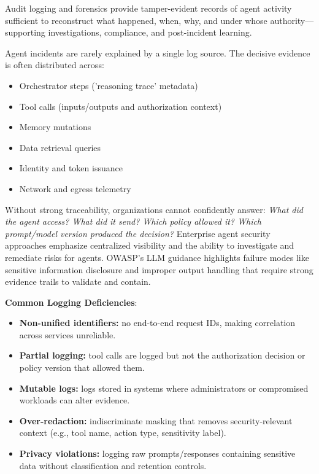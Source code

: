 \begin{TNtwocol}
    Audit logging and forensics provide tamper-evident records of agent activity sufficient to reconstruct what happened, when, why, and under whose authority—supporting investigations, compliance, and post-incident learning.

    Agent incidents are rarely explained by a single log source. The decisive evidence is often distributed across:
    \begin{itemize}
        \item Orchestrator steps ('reasoning trace' metadata)
        \item Tool calls (inputs/outputs and authorization context)
        \item Memory mutations
        \item Data retrieval queries
        \item Identity and token issuance
        \item Network and egress telemetry
    \end{itemize}

    Without strong traceability, organizations cannot confidently answer: \textit{What did the agent access? What did it send? Which policy allowed it? Which prompt/model version produced the decision?} Enterprise agent security approaches emphasize centralized visibility and the ability to investigate and remediate risks for agents.  OWASP's LLM guidance highlights failure modes like sensitive information disclosure and improper output handling that require strong evidence trails to validate and contain.

    \textbf{Common Logging Deficiencies}:
    \begin{itemize}
        \item \textbf{Non-unified identifiers:} no end-to-end request IDs, making correlation across services unreliable.
        \item \textbf{Partial logging:} tool calls are logged but not the authorization decision or policy version that allowed them.
        \item \textbf{Mutable logs:} logs stored in systems where administrators or compromised workloads can alter evidence.
        \item \textbf{Over-redaction:} indiscriminate masking that removes security-relevant context (e.g., tool name, action type, sensitivity label).
        \item \textbf{Privacy violations:} logging raw prompts/responses containing sensitive data without classification and retention controls.
    \end{itemize}


\end{TNtwocol}
